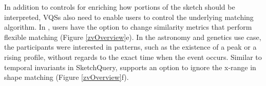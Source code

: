 \par In addition to controls for enriching how portions of the sketch should be interpreted, VQSs also need to enable users to control the underlying matching algorithm. In \zv, users have the option to change similarity metrics that perform flexible matching (Figure \ref{zvOverview}e). In the astronomy and genetics use case, the participants were interested in patterns, such as the existence of a peak or a rising profile, without regards to the exact time when the event occurs. Similar to temporal invariants in SketchQuery, \zv supports an option to ignore the x-range in shape matching (Figure \ref{zvOverview}f). %

